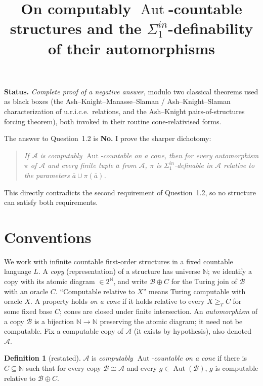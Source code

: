 \documentclass{article}
\newcommand{\N}{\mathbb{N}}
\newcommand{\A}{\mathcal{A}}
\newcommand{\B}{\mathcal{B}}
\newcommand{\AUT}{\operatorname{Aut}}
\newcommand{\Sin}{\Sigma^{in}_1}
\newcommand{\bara}{\bar a}
\theoremstyle{plain}
\theoremstyle{definition}
\newtheorem{definition}{Definition}
\begin{document}
\title{On computably $\AUT$-countable structures and the $\Sin$-definability of their automorphisms}
\author{}
\date{}
\maketitle

\noindent\textbf{Status.} \emph{Complete proof of a negative answer}, modulo two
classical theorems used as black boxes (the Ash--Knight--Manasse--Slaman / Ash--Knight--Slaman
characterization of u.r.i.c.e.\ relations, and the Ash--Knight pairs-of-structures
forcing theorem), both invoked in their routine cone-relativised forms.

\medskip
\noindent The answer to Question~1.2 is \textbf{No.} I prove the sharper dichotomy:

\begin{quote}\itshape
If $\A$ is computably $\AUT$-countable on a cone, then for \emph{every} automorphism
$\pi$ of $\A$ and \emph{every} finite tuple $\bara$ from $\A$, $\pi$ \emph{is}
$\Sin$-definable in $\A$ relative to the parameters $\bara\cup\pi(\bara)$.
\end{quote}

\noindent This directly contradicts the second requirement of Question~1.2, so no
structure can satisfy both requirements.

\bigskip

\section{Conventions}

We work with infinite countable first-order structures in a fixed countable language
$L$. A \emph{copy} (representation) of a structure has universe $\N$; we identify a
copy with its atomic diagram $\in 2^\N$, and write $\B\oplus C$ for the Turing join of
$\B$ with an oracle $C$. ``Computable relative to $X$'' means Turing computable with
oracle $X$. A property holds \emph{on a cone} if it holds relative to every
$X\geq_T C$ for some fixed base $C$; cones are closed under finite intersection. An
\emph{automorphism} of a copy $\B$ is a bijection $\N\to\N$ preserving the atomic
diagram; it need not be computable. Fix a computable copy of $\A$ (it exists by
hypothesis), also denoted $\A$.

\begin{definition}[restated]\label{def:autcount}
$\A$ is \emph{computably $\AUT$-countable on a cone} if there is $C\subseteq\N$ such
that for every copy $\B\cong\A$ and every $g\in\AUT(\B)$, $g$ is computable relative
to $\B\oplus C$.
\end{definition}
\end{document}
